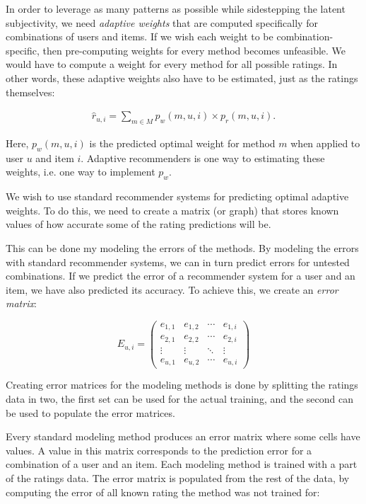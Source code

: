 In order to leverage as many patterns as possible while sidestepping the latent subjectivity,
we need \emph{adaptive weights} that are computed specifically for combinations of users and items.
If we wish each weight to be combination-specific, then pre-computing weights for every method becomes unfeasible.
We would have to compute a weight for every method for all possible ratings.
In other words, these adaptive weights also have to be estimated, just as the ratings themselves:

\begin{eqnarray*}
  \hat{r}_{u,i} = \sum_{m \in M} p_{w}(m,u,i) \times p_{r}(m,u,i).
\end{eqnarray*}

Here, $p_w(m,u,i)$ is the predicted optimal weight for method $m$ when applied to user $u$ and item $i$.
Adaptive recommenders is one way to estimating these weights, i.e. one way to implement $p_w$.

We wish to use standard recommender systems for predicting optimal adaptive weights.
To do this, we need to create a matrix (or graph)
that stores known values of how accurate some of the rating predictions will be.

This can be done my modeling the errors of the methods.
By modeling the errors with standard recommender systems,
we can in turn predict errors for untested combinations.
If we predict the error of a recommender system for a user and an item,
we have also predicted its accuracy.
To achieve this, we create an \emph{error matrix}:

\begin{equation*}
 E_{u,i} =
 \begin{pmatrix}
    e_{1,1} & e_{1,2} & \cdots & e_{1,i} \\
    e_{2,1} & e_{2,2} & \cdots & e_{2,i} \\
    \vdots  & \vdots  & \ddots & \vdots  \\
    e_{u,1} & e_{u,2} & \cdots & e_{u,i}
 \end{pmatrix}
\end{equation*}

Creating error matrices for the modeling methods is done by splitting the ratings data in two,
the first set can be used for the actual training, and the second
can be used to populate the error matrices.

Every standard modeling method produces an error matrix where some cells have values.
A value in this matrix corresponds to the prediction error for a combination of a user and an item.
Each modeling method is trained with a part of the ratings data.
The error matrix is populated from the rest of the data,
by computing the error of all known rating the method was not trained for:

